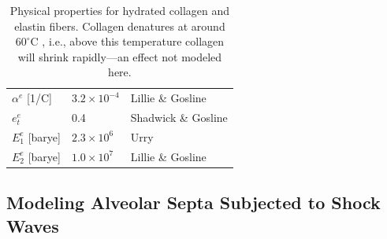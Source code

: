 \begin{table}
\begin{tabular}{|l|l|l|}
        $\alpha^e$ \hfill [1/C] & $3.2\times 10^{-4}$ & 
        Lillie \& Gosline \cite{LillieGosline02a} \\ 
        $e^e_t$ & 0.4 & Shadwick \& Gosline \cite{ShadwickGosline85} \\
        $E^e_1$ \hfill [barye] & $2.3 \times 10^6$ & Urry \cite[Fig.~18]{Urry89} \\ 
        $E^e_2$ \hfill [barye] & $1.0 \times 10^7$ & 
        Lillie \& Gosline \cite[Fig.~5]{LillieGosline07} \\ \hline
    \end{tabular}
    \caption{Physical properties for hydrated collagen and elastin fibers.  Collagen denatures at around $60^\circ$C \cite{HoermannSchlebusch71}, i.e., above this temperature collagen will shrink rapidly---an effect not modeled here.}
    \label{tableCollagenElastin}
\end{table}

\subsection{Modeling Alveolar Septa Subjected to Shock Waves}
\label{secConjugatePairs}

